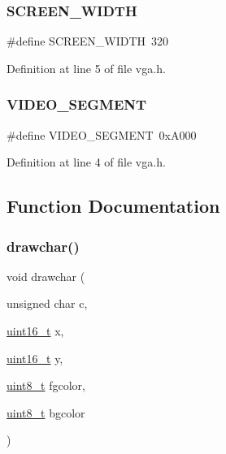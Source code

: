 \subsubsection{\texorpdfstring{S\+C\+R\+E\+E\+N\+\_\+\+W\+I\+D\+TH}{SCREEN\_WIDTH}}
{\footnotesize\ttfamily \#define S\+C\+R\+E\+E\+N\+\_\+\+W\+I\+D\+TH~320}



Definition at line 5 of file vga.\+h.

\mbox{\label{a00011_a818608c80027ef8ff56d31ebaedf58f3_a818608c80027ef8ff56d31ebaedf58f3}} 
\subsubsection{\texorpdfstring{V\+I\+D\+E\+O\+\_\+\+S\+E\+G\+M\+E\+NT}{VIDEO\_SEGMENT}}
{\footnotesize\ttfamily \#define V\+I\+D\+E\+O\+\_\+\+S\+E\+G\+M\+E\+NT~0x\+A000}



Definition at line 4 of file vga.\+h.



\subsection{Function Documentation}
\mbox{\label{a00011_a2c8df7a20b47341b70d97a7ff21d86ea_a2c8df7a20b47341b70d97a7ff21d86ea}} 
\subsubsection{\texorpdfstring{drawchar()}{drawchar()}}
{\footnotesize\ttfamily void drawchar (\begin{DoxyParamCaption}\item[{unsigned char}]{c,  }\item[{\hyperlink{a00068_a273cf69d639a59973b6019625df33e30_a273cf69d639a59973b6019625df33e30}{uint16\+\_\+t}}]{x,  }\item[{\hyperlink{a00068_a273cf69d639a59973b6019625df33e30_a273cf69d639a59973b6019625df33e30}{uint16\+\_\+t}}]{y,  }\item[{\hyperlink{a00068_aba7bc1797add20fe3efdf37ced1182c5_aba7bc1797add20fe3efdf37ced1182c5}{uint8\+\_\+t}}]{fgcolor,  }\item[{\hyperlink{a00068_aba7bc1797add20fe3efdf37ced1182c5_aba7bc1797add20fe3efdf37ced1182c5}{uint8\+\_\+t}}]{bgcolor }\end{DoxyParamCaption})}



